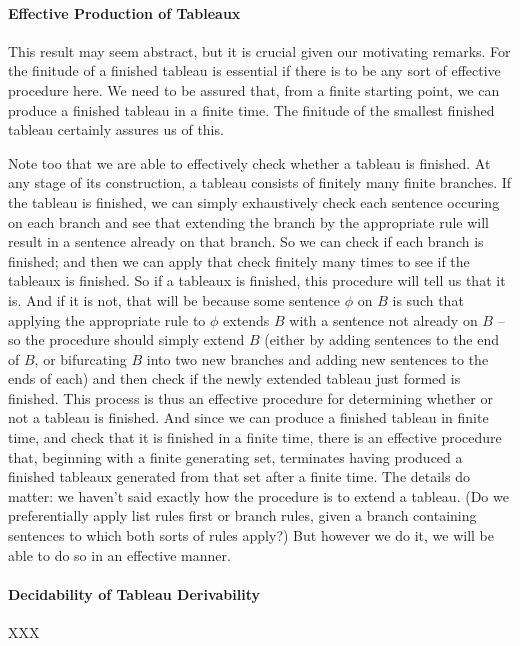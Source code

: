 \paragraph{Effective Production of Tableaux} This result may seem abstract, but it is crucial given our motivating remarks. For the finitude of a finished tableau is essential if there is to be any sort of effective procedure here. We need to be assured that, from a finite starting point, we can produce a finished tableau in a finite time. The finitude of the smallest finished tableau certainly assures us of this. 

Note too that we are able to effectively check whether a tableau is finished. At any stage of its construction, a tableau consists of finitely many finite branches. If the tableau is finished, we can simply exhaustively check each sentence occuring on each branch and see that extending the branch by the appropriate rule will result in a sentence already on that branch. So we can check if each branch is finished; and then we can apply that check finitely many times to see if the tableaux is finished. So if a tableaux is finished, this procedure will tell us that it is. And if it is not, that will be because some sentence $\phi$ on $B$ is such that applying the appropriate rule to $\phi$ extends $B$ with a sentence not already on $B$ – so the procedure should simply extend $B$ (either by adding sentences to the end of $B$, or bifurcating $B$ into two new branches and adding new sentences to the ends of each) and then check if the newly extended tableau just formed is finished. This process is thus an effective procedure for determining whether or not a tableau is finished. And since we can produce a finished tableau in finite time, and check that it is finished in a finite time, there is an effective procedure that, beginning with a finite generating set, terminates having produced a finished tableaux generated from that set after a finite time. The details do matter: we haven't said exactly how the procedure is to extend a tableau. (Do we preferentially apply list rules first or branch rules, given a branch containing sentences to which both sorts of rules apply?) 
But however we do it, we will be able to do so in an effective manner.

\paragraph{Decidability of Tableau Derivability}

XXX



